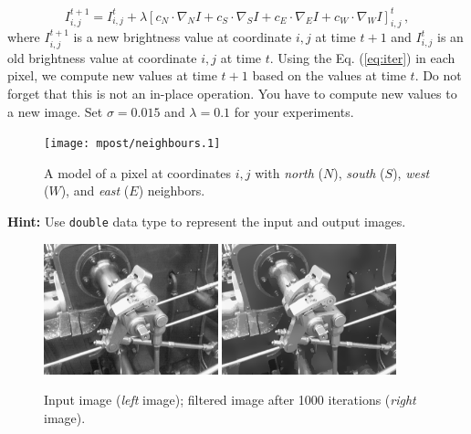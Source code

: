 \documentclass[12pt]{article}
\begin{document}
\begin{equation} \label{eq:iter}
    I_{i,j}^{t+1} = I_{i,j}^{t} + \lambda \left[ c_N \cdot \nabla_N I + c_S \cdot \nabla_S I + c_E \cdot \nabla_E I + c_W \cdot \nabla_W I \right]_{i,j}^{t} \, ,
\end{equation}
where $I_{i,j}^{t+1}$ is a new brightness value at coordinate $i,j$ at time $t+1$ and $I_{i,j}^t$ is an old brightness
value at coordinate $i,j$ at time $t$. Using the Eq. (\ref{eq:iter}) in each pixel, we compute new values at time $t+1$
based on the values at time $t$. Do not forget that this is not an in-place operation. You have to compute new values
to a new image.
\newline
\newline
Set $\sigma = 0.015$ and $\lambda = 0.1$ for your experiments.
\newline
\begin{figure}
    \centering
    \texttt{[image: mpost/neighbours.1]}
    \caption{A model of a pixel at coordinates $i,j$ with \textit{north} ($N$), \textit{south} ($S$), \textit{west} ($W$),
    and \textit{east} ($E$) neighbors.}
    \label{fig:neighborhood}
\end{figure}

\noindent
\textbf{Hint:} Use \texttt{double} data type to represent the input and output images.


\begin{figure}
    \centering
    \includegraphics[width=0.45\textwidth]{input_image.png}
    \includegraphics[width=0.45\textwidth]{anisotropic_filter_image.png}
    \caption{Input image (\textit{left} image); filtered image after 1000 iterations (\textit{right} image).}
\end{figure}
\end{document}
